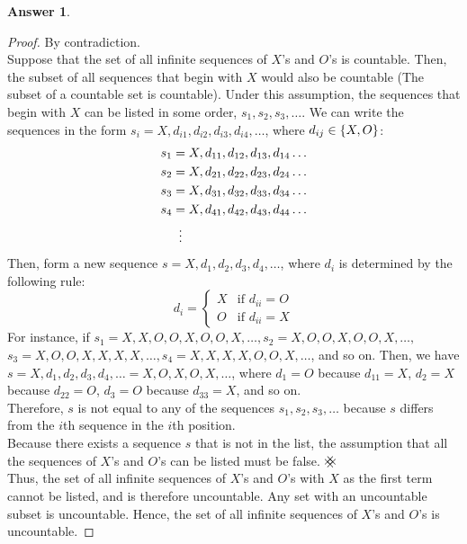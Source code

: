 \documentclass[article, 12pt]{article}
\theoremstyle{definition}
\newtheorem{answer}{Answer}
\DeclarePairedDelimiter\set{\{}{\}}
\newcommand{\contradiction}{{\hbox{%
    \setbox0=\hbox{$\mkern-3mu\times\mkern-3mu$}%
    \setbox1=\hbox to0pt{\hss$\times$\hss}%
    \copy0\raisebox{0.5\wd0}{\copy1}\raisebox{-0.5\wd0}{\box1}\box0
}}}
\begin{document}
    \begin{answer}
        
        \begin{proof} By contradiction. 
            \\[12pt]
            Suppose that the set of all infinite sequences of $X$'s and $O$'s is countable. Then, the subset of all sequences that begin with $X$ would also be countable (The subset of a countable set is countable). Under this assumption, the sequences that begin with $X$ can be listed in some order, $s_1, s_2, s_3, \dots$. We can write the sequences in the form $s_i = X, d_{i1}, d_{i2}, d_{i3}, d_{i4}, \dots$, where $d_{ij} \in \set*{X,O}$:
            \begin{align*}
                s_1 &= X,d_{11},d_{12},d_{13},d_{14}\dots \\
                s_2 &= X,d_{21},d_{22},d_{23},d_{24}\dots \\
                s_3 &= X,d_{31},d_{32},d_{33},d_{34}\dots \\
                s_4 &= X,d_{41},d_{42},d_{43},d_{44}\dots \\
                    &\vdotswithin{=}
            \end{align*}
            Then, form a new sequence $s = X, d_1, d_2, d_3, d_4, \dots$, where $d_i$ is determined by the following rule:
            \begin{equation*}
                d_i = \begin{cases}
                    X & \text{if } d_{ii} = O \\
                    O & \text{if } d_{ii} = X
                \end{cases}
            \end{equation*}
            For instance, if $s_1 = X, X, O, O, X, O, O, X, \dots, s_2 = X, O, O, X, O, O, X, \dots,$ \\ $s_3 = X, O, O, X, X, X, X, \dots, s_4 = X, X, X, X, O, O, X, \dots$, and so on. Then, we have $s = X, d_1, d_2, d_3, d_4, \dots = X, O, X, O, X, \dots$, where $d_1 = O$ because $d_{11} = X$, $d_2 = X$ because $d_{22} = O$, $d_3 = O$ because $d_{33} = X$, and so on. 
            \\[12pt]
            Therefore, $s$ is not equal to any of the sequences $s_1, s_2, s_3, \dots$ because $s$ differs from the $i$th sequence in the $i$th position. 
            \\[12pt]
            Because there exists a sequence $s$ that is not in the list, the assumption that all the sequences of $X$'s and $O$'s can be listed must be false. $\contradiction$ 
            \\[12pt]
            Thus, the set of all infinite sequences of $X$'s and $O$'s with $X$ as the first term cannot be listed, and is therefore uncountable. Any set with an uncountable subset is uncountable. Hence, the set of all infinite sequences of $X$'s and $O$'s is uncountable.
        \end{proof}
    \end{answer}
\end{document}
